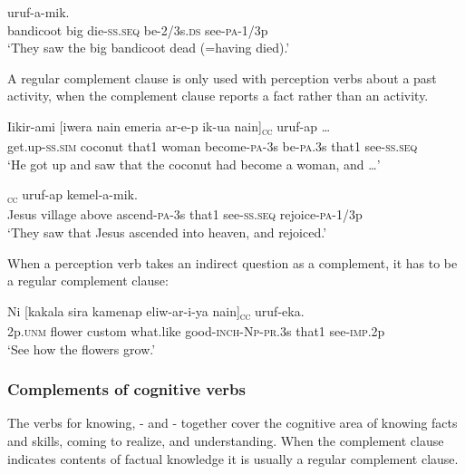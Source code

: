\ea%
\label{ex:8:x1600}
  uruf-a-mik. \\
bandicoot  big  die-\textsc{ss}.\textsc{seq} be-2/3s.\textsc{ds}  see-\textsc{pa}-1/3p\\
\glt`They saw the big bandicoot dead (=having died).'
\z


A regular complement clause is only used with perception verbs about a past activity, when the complement clause reports a fact rather than an activity. 

\ea%
\label{ex:8:x1628}
\gll Iikir-ami  [iwera  nain  emeria  ar-e-p  ik-ua nain]\textsubscript{\textsc{cc}}  uruf-ap  {\dots}\\
get.up-\textsc{ss}.\textsc{sim} coconut that1 woman become-\textsc{pa}-3s be-\textsc{pa}.3s that1 see-\textsc{ss}.\textsc{seq}\\
\glt`He got up and saw that the coconut had become a woman, and {\dots}'
\z


\ea%
\label{ex:8:x1629}
\textsubscript{\textsc{cc}}  uruf-ap kemel-a-mik.\\
Jesus  village  above  ascend-\textsc{pa}-3s that1 see-\textsc{ss}.\textsc{seq} rejoice-\textsc{pa}-1/3p\\
\glt`They saw that Jesus ascended into heaven, and rejoiced.'
\z


When a perception verb takes an indirect question as a complement, it has to be a regular complement clause:

\ea%
\label{ex:8:x1631}
\gll Ni  [kakala  sira  kamenap  eliw-ar-i-ya  nain]\textsubscript{\textsc{cc}} uruf-eka.\\
2p.\textsc{unm} flower  custom  what.like  good-\textsc{inch}-\textsc{Np}-\textsc{pr}.3s that1 see-\textsc{imp}.2p\\
\glt`See how the flowers grow.'
\z


\subsubsection{Complements of cognitive verbs}

The verbs for knowing, - and - together cover the cognitive area of knowing facts and skills, coming to realize, and understanding. When the complement clause indicates contents of factual knowledge it is usually a regular complement clause.

